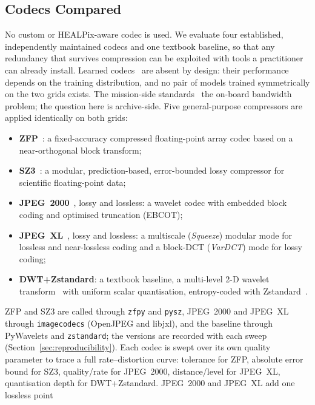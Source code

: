 \subsection{Codecs Compared}
\label{sec:codecs}
No custom or HEALPix-aware codec is used. We evaluate four established,
independently maintained codecs and one textbook baseline, so that any redundancy that survives
compression can be exploited with tools a practitioner can already
install. Learned
codecs~\cite{balle2017endtoend,valsesia2019onboard} are absent by
design: their performance depends on the training distribution, and no
pair of models trained symmetrically on the two grids exists. The
mission-side
standards~\cite{blanes2014tutorial,hernandez2021ccsds123,abrardo2010onboard}
 the on-board bandwidth problem; the question here is
archive-side. Five general-purpose compressors are applied identically
on both grids:
\begin{itemize}
    \item \textbf{ZFP}~\cite{lindstrom2014zfp}: a fixed-accuracy compressed floating-point array codec based on a near-orthogonal block transform;
    \item \textbf{SZ3}~\cite{liang2022sz3}: a modular, prediction-based, error-bounded lossy compressor for scientific floating-point data;
    \item \textbf{JPEG~2000}~\cite{taubman2000jpeg2000}, lossy and lossless: a wavelet codec with embedded block coding and optimised truncation (EBCOT);
    \item \textbf{JPEG~XL}~\cite{alakuijala2019jpegxl}, lossy and lossless: a multiscale (\emph{Squeeze}) modular mode for lossless and near-lossless coding and a block-DCT (\emph{VarDCT}) mode for lossy coding;
    \item \textbf{DWT+Zstandard}: a textbook baseline, a multi-level 2-D wavelet transform~\cite{antonini1992wavelet} with uniform scalar quantisation, entropy-coded with Zstandard~\cite{rfc8878zstd}.
\end{itemize}
ZFP and SZ3 are called through \texttt{zfpy} and \texttt{pysz}, JPEG~2000
and JPEG~XL through \texttt{imagecodecs} (OpenJPEG and libjxl), and the
baseline through PyWavelets and \texttt{zstandard}; the versions are
recorded with each sweep (Section~\ref{sec:reproducibility}).
Each codec is swept over its own quality parameter to trace a full
rate--distortion curve: tolerance for ZFP, absolute error bound for SZ3,
quality/rate for JPEG~2000, distance/level for JPEG~XL, quantisation
depth for DWT+Zstandard. JPEG~2000 and JPEG~XL add one lossless point
